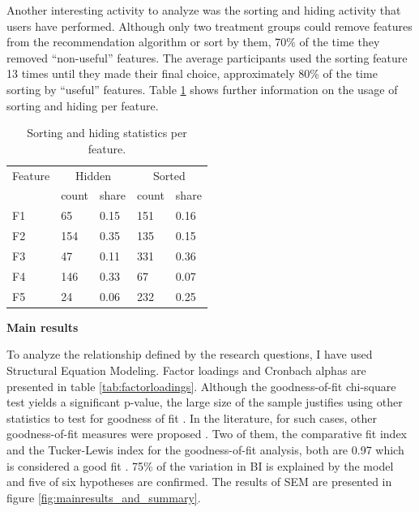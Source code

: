 \documentclass[a4paper,12pt]{article}
\begin{document}
Another interesting activity to analyze was the sorting and hiding activity that users have performed. Although only two treatment groups could remove features from the recommendation algorithm or sort by them, 70\% of the time they removed ``non-useful'' features. The average participants used the sorting feature 13 times until they made their final choice, approximately 80\% of the time sorting by ``useful'' features. Table \ref{tab:eventsperfeature} shows further information on the usage of sorting and hiding per feature.

\begin{table}[!ht]
    \centering
    \begin{tabular}{lllll}
    \toprule
        Feature & \multicolumn{2}{c}{Hidden} & \multicolumn{2}{c}{Sorted} \\ \cmidrule(lr){2-3} \cmidrule(lr){4-5}
        & count & share & count & share \\ \midrule
        F1 & 65 & 0.15 & 151 & 0.16 \\
        F2 & 154 & 0.35 & 135 & 0.15 \\
        F3 & 47 & 0.11 & 331 & 0.36 \\
        F4 & 146 & 0.33 & 67 & 0.07 \\
        F5 & 24 & 0.06 & 232 & 0.25 \\ \bottomrule
    \end{tabular}
    \caption{Sorting and hiding statistics per feature.}
    \label{tab:eventsperfeature}
\end{table}

\textbf{Main results}

To analyze the relationship defined by the research questions, I have used Structural Equation Modeling. Factor loadings and Cronbach alphas are presented in table \ref{tab:factorloadings}. Although the goodness-of-fit chi-square test yields a significant p-value, the large size of the sample justifies using other statistics to test for goodness of fit \citep{schermelleh2003evaluating}. In the literature, for such cases, other goodness-of-fit measures were proposed \citep{schreiber2006reporting}. Two of them, the comparative fit index and the Tucker-Lewis index for the goodness-of-fit analysis, both are 0.97 which is considered a good fit \citep{schumacker2004beginner}. 75\% of the variation in BI is explained by the model and five of six hypotheses are confirmed. The results of SEM are presented in figure \ref{fig:mainresults_and_summary}. 
\end{document}
